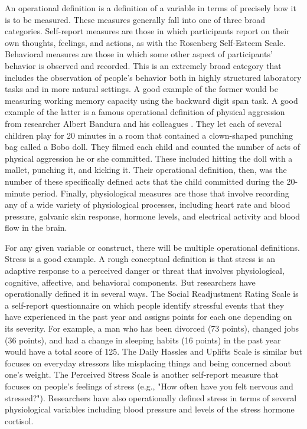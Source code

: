 An operational definition is a definition of a variable in terms of precisely how it is to be measured. These measures generally fall into one of three broad categories. Self-report measures are those in which participants report on their own thoughts, feelings, and actions, as with the Rosenberg Self-Esteem Scale. Behavioral measures are those in which some other aspect of participants' behavior is observed and recorded. This is an extremely broad category that includes the observation of people's behavior both in highly structured laboratory tasks and in more natural settings. A good example of the former would be measuring working memory capacity using the backward digit span task. A good example of the latter is a famous operational definition of physical aggression from researcher Albert Bandura and his colleagues \citep{bandura_transmission_2006}. They let each of several children play for 20 minutes in a room that contained a clown-shaped punching bag called a Bobo doll. They filmed each child and counted the number of acts of physical aggression he or she committed. These included hitting the doll with a mallet, punching it, and kicking it. Their operational definition, then, was the number of these specifically defined acts that the child committed during the 20-minute period. Finally, physiological measures are those that involve recording any of a wide variety of physiological processes, including heart rate and blood pressure, galvanic skin response, hormone levels, and electrical activity and blood flow in the brain.

For any given variable or construct, there will be multiple operational definitions. Stress is a good example. A rough conceptual definition is that stress is an adaptive response to a perceived danger or threat that involves physiological, cognitive, affective, and behavioral components. But researchers have operationally defined it in several ways. The Social Readjustment Rating Scale is a self-report questionnaire on which people identify stressful events that they have experienced in the past year and assigns points for each one depending on its severity. For example, a man who has been divorced (73 points), changed jobs (36 points), and had a change in sleeping habits (16 points) in the past year would have a total score of 125. The Daily Hassles and Uplifts Scale is similar but focuses on everyday stressors like misplacing things and being concerned about one's weight. The Perceived Stress Scale is another self-report measure that focuses on people's feelings of stress (e.g., "How often have you felt nervous and stressed?"). Researchers have also operationally defined stress in terms of several physiological variables including blood pressure and levels of the stress hormone cortisol.

